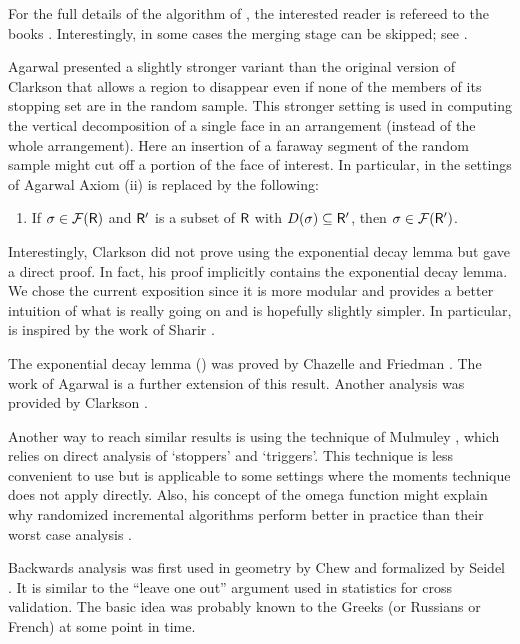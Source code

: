 For the full details of the algorithm of
, the interested reader is refereed to
the books \cite{bcko-cgaa-08, by-ag-98}. Interestingly, in some cases
the merging stage can be skipped; see \cite{h-cctp-00}.

Agarwal \etal \cite{ams-cmfal-98} presented a slightly stronger
variant than the original version of Clarkson \cite{c-arscg-88} that
allows a region to disappear even if none of the members of its
stopping set are in the random sample.  This stronger setting is used
in computing the vertical decomposition of a single face in an
arrangement (instead of the whole arrangement). Here an insertion of a
faraway segment of the random sample  might cut
off a portion of the face of interest. In particular, in the settings
of Agarwal \etal{} Axiom (ii) is replaced by the following:
\begin{enumerate}
    \item[(ii)]  %
    If $\Trap \in \RegionsSet{\Sample}$ and $\mathsf{R}'$ is a subset of
    $\mathsf{R}$ with $\DefSet{\Trap } \subseteq \SampleA$, then $\Trap
    \in \RegionsSet{\SampleA}$.
\end{enumerate}


Interestingly, Clarkson \cite{c-arscg-88} did not prove 
using the exponential decay lemma but gave a direct proof. In fact,
his proof implicitly contains the exponential decay lemma.  We chose
the current exposition since it is more modular and provides a better
intuition of what is really going on and is hopefully slightly
simpler.  In particular,  is inspired by the
work of Sharir \cite{s-cstre-01}.


The exponential decay lemma () was proved by
Chazelle and Friedman \cite{cf-dvrsi-90}. The work of Agarwal \etal
\cite{ams-cmfal-98} is a further extension of this result. Another
analysis was provided by Clarkson \etal \cite{cms-frric-93}.

Another way to reach similar results is using the technique of
Mulmuley \cite{m-cgitr-94}, which relies on direct analysis of
`stoppers' and `triggers'. This technique is less convenient
to use but is applicable to some settings where the moments technique
does not apply directly.  Also, his concept of the omega function
might explain why randomized incremental algorithms perform better
in practice than their worst case analysis \cite{m-eahsr-89}.

Backwards analysis was first used in geometry by Chew
\cite{c-bvdcp-86} and formalized by Seidel
\cite{s-barga-93}. It
is similar to the ``leave one out'' argument used in statistics for
cross validation. The basic idea was probably known to the Greeks (or
Russians or French) at some point in time.


